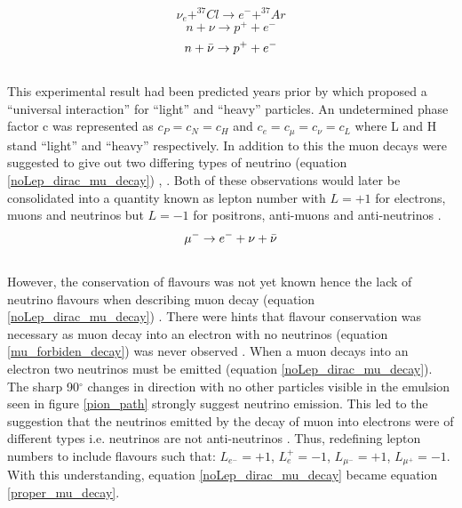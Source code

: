 \begin{equation}
    \nu_e + ^{37}Cl \rightarrow  e^- + ^{37}Ar
    \label{neutrino_chlorine_decay}
\end{equation}
\begin{equation}
    n + \nu \rightarrow p^+ + e^-
    \label{no_lepNo_dirac_nu_capture}
\end{equation}
\begin{equation}
    n + \Bar{\nu} \rightarrow p^+ + e^-
    \label{no_lepNo_maj_nu_capture}
\end{equation}
\\This experimental result had been predicted years prior by \cite{konopinski1953universal} which proposed a ``universal interaction'' for ``light'' and ``heavy'' particles. An undetermined phase factor c was represented as $c_P=c_N=c_H$ and $c_e=c_\mu=c_\nu=c_L$ where L and H stand ``light'' and ``heavy'' respectively. In addition to this the muon decays were suggested to give out two differing types of neutrino (equation \ref{noLep_dirac_mu_decay})  \cite{griffiths2008neutrino1.5}, \cite{konopinski1953universal}. Both of these observations would later be consolidated into a quantity known as lepton number with $L=+1$ for electrons, muons and neutrinos but $L=-1$ for positrons, anti-muons and anti-neutrinos \cite{griffiths2008neutrino1.5}. 
\begin{equation}
    \mu^- \rightarrow e^- + \nu + \Bar{\nu}
    \label{noLep_dirac_mu_decay}
\end{equation}
\\However, the conservation of flavours was not yet known hence the lack of neutrino flavours when describing muon decay (equation \ref{noLep_dirac_mu_decay})  \cite{griffiths2008neutrino1.5}. There were hints that flavour conservation was necessary as muon decay into an electron with no neutrinos (equation \ref{mu_forbiden_decay}) was never observed \cite{griffiths2008neutrino1.5}. When a muon decays into an electron two neutrinos must be emitted (equation \ref{noLep_dirac_mu_decay}). The sharp 90$^\circ$ changes in direction with no other particles visible in the emulsion seen in figure \ref{pion_path} strongly suggest neutrino emission. This led to the suggestion that the neutrinos emitted by the decay of muon into electrons were of different types i.e. neutrinos are not anti-neutrinos \cite{Lee:1960tja}  \cite{griffiths2008neutrino1.5}. Thus, redefining lepton numbers to include flavours such that: $L_{e^-} = +1$, $L_e^+ = -1$, $L_{\mu^-} = +1 $, $L_{\mu^+} = -1 $. With this understanding, equation \ref{noLep_dirac_mu_decay} became equation \ref{proper_mu_decay}.
